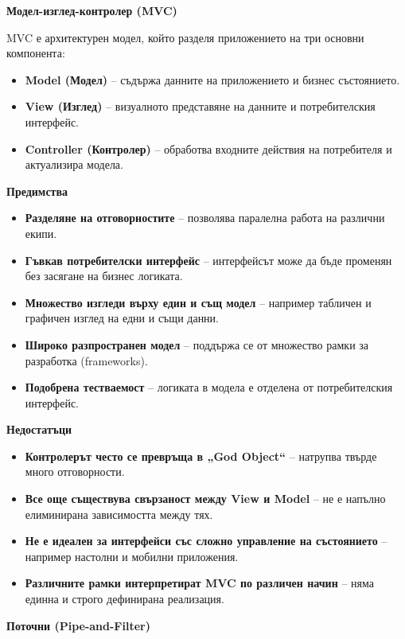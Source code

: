 \documentclass{article}
\renewcommand{\\}{\newline}
\begin{document}
\textbf{Модел-изглед-контролер (MVC)}

MVC е архитектурен модел, който разделя приложението на три основни компонента:

\begin{itemize}
    \item \textbf{Model (Модел)} – съдържа данните на приложението и бизнес състоянието.
    \item \textbf{View (Изглед)} – визуалното представяне на данните и потребителския интерфейс.
    \item \textbf{Controller (Контролер)} – обработва входните действия на потребителя и актуализира модела.
\end{itemize}

\textbf{Предимства}

\begin{itemize}
    \item \textbf{Разделяне на отговорностите} – позволява паралелна работа на различни екипи.
    \item \textbf{Гъвкав потребителски интерфейс} – интерфейсът може да бъде променян без засягане на бизнес логиката.
    \item \textbf{Множество изгледи върху един и същ модел} – например табличен и графичен изглед на едни и същи данни.
    \item \textbf{Широко разпространен модел} – поддържа се от множество рамки за разработка (frameworks).
    \item \textbf{Подобрена тестваемост} – логиката в модела е отделена от потребителския интерфейс.
\end{itemize}

\textbf{Недостатъци}

\begin{itemize}
    \item \textbf{Контролерът често се превръща в „God Object“} – натрупва твърде много отговорности.
    \item \textbf{Все още съществува свързаност между View и Model} – не е напълно елиминирана зависимостта между тях.
    \item \textbf{Не е идеален за интерфейси със сложно управление на състоянието} – например настолни и мобилни приложения.
    \item \textbf{Различните рамки интерпретират MVC по различен начин} – няма единна и строго дефинирана реализация.
\end{itemize}

\textbf{Поточни (Pipe-and-Filter)}
\end{document}
